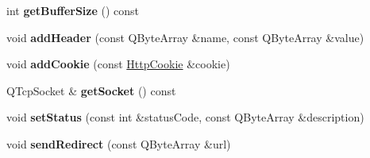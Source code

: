 \begin{DoxyCompactItemize}
int {\bfseries get\+Buffer\+Size} () const
\item 
\mbox{\label{class_http_servlet_response_ae9bd0d1b4fa31ffc03e93253a1f41a36}} 
void {\bfseries add\+Header} (const Q\+Byte\+Array \&name, const Q\+Byte\+Array \&value)
\item 
\mbox{\label{class_http_servlet_response_a40fb3e4c9ababe741ddbda87c932409d}} 
void {\bfseries add\+Cookie} (const \hyperlink{class_http_cookie}{Http\+Cookie} \&cookie)
\item 
\mbox{\label{class_http_servlet_response_ad0b56cbd0a1ccfc35bfeb3248050cd18}} 
Q\+Tcp\+Socket \& {\bfseries get\+Socket} () const
\item 
\mbox{\label{class_http_servlet_response_a180f9d63cb4640fcf13f01badef9fede}} 
void {\bfseries set\+Status} (const int \&status\+Code, const Q\+Byte\+Array \&description)
\item 
\mbox{\label{class_http_servlet_response_a3f4a749e518ad2b89aaf179c5e5fe034}} 
void {\bfseries send\+Redirect} (const Q\+Byte\+Array \&url)
\end{DoxyCompactItemize}
